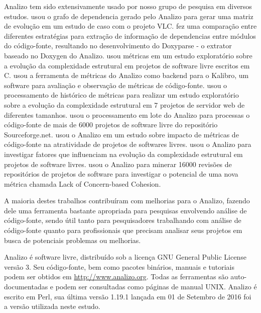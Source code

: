 Analizo tem sido extensivamente usado por nosso grupo de pesquisa em diversos
estudos.
\cite{Amaral2009} usou o grafo de dependencia gerado pelo Analizo para
  gerar uma matriz de evolução em um estudo de caso com o projeto VLC.
\cite{Costa2009} fez uma comparação entre diferentes estratégias para
  extração de informação de dependencias entre módulos do código-fonte,
  resultando no desenvolvimento do Doxyparse - o extrator baseado no Doxygen do
  Analizo.
\cite{Terceiro2009} usou métricas em um estudo exploratório sobre a
  evolução da complexidade estrutural em projetos de software livre escritos em
  C.
\cite{Morais2009} usou a ferramenta de métricas do Analizo como backend
  para o Kalibro, um software para avaliação e observação de métricas de código-fonte.
\cite{Terceiro2010} usou o processamento de histórico de métricas para
  realizar um estudo exploratório sobre a evolução da complexidade estrutural em
  7 projetos de servidor web de diferentes tamanhos.
\cite{Meirelles2010} usou o processamento em lote do Analizo para
  processas o código-fonte de mais de 6000 projetos de software livre do
  repositório Sourceforge.net.
\cite{Meirelles2011} usou o Analizo em um estudo sobre impacto de
  métricas de código-fonte na atratividade de projetos de softwares livres.
\cite{Terceiro2012Understanding} usou o Analizo para investigar fatores
  que influenciam na evolução da complexidade estrutural em projetos de software
  livres.
\cite{Silva2012} usou o Analizo para minerar 16000 revisões de
  repositórios de projetos de software para investigar o potencial de uma nova
  métrica chamada Lack of Concern-based Cohesion.



A maioria destes trabalhos contribuíram com melhorias para o Analizo, fazendo
dele uma ferramenta bastante apropriada para pesquisas envolvendo análise de código-fonte,
sendo útil tanto para pesquisadores trabalhando com análise de código-fonte
quanto para profissionais que precisam analisar seus projetos em busca de
potenciais problemas ou melhorias.

Analizo é software livre, distribuído sob a licença GNU General Public License
versão 3. Seu código-fonte, bem como pacotes binários, manuais e tutoriais
podem ser obtidos em \url{http://www.analizo.org}. Todas as ferramentas são
auto-documentadas e podem ser consultadas como páginas de manual UNIX. Analizo
é escrito em Perl, sua última versão 1.19.1 lançada em 01 de Setembro de 2016
foi a versão utilizada neste estudo.


